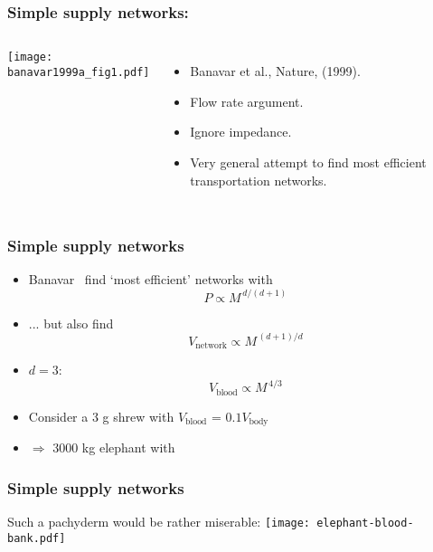 \begin{frame}
  \frametitle{Simple supply networks:}

  \begin{block}{}
  \begin{columns}
    \texttt{[image: banavar1999a\_fig1.pdf]}
    \begin{itemize}
    \item 
      Banavar et al., Nature, (1999)\cite{banavar1999a}.
    \item 
      Flow rate argument.
    \item 
      Ignore impedance.
    \item 
      Very general attempt to find most efficient transportation networks.
    \end{itemize}
  \end{columns}
    
  \end{block}


\end{frame}


\begin{frame}
  \frametitle{Simple supply networks}

  \begin{block}{}
  \begin{itemize}
  \item<1->
    Banavar \etal\ find `most efficient' networks with
    $$P \propto M^{\, d/(d+1)}$$
  \item<2->
    ... but also find 
    $$V_{\textrm{network}} \propto M^{\, (d+1)/d}$$
  \item<3->
    $d=3$:
    $$V_{\textrm{blood}} \propto M^{\, 4/3}$$
  \item<4-> Consider a 3 g shrew with $V_{\textrm{blood}}$ = $0.1V_{\textrm{body}}$
  \item<5-> $\Rightarrow$
    3000 kg elephant with 
  \end{itemize}
  \end{block}

\end{frame}

\begin{frame}
  \frametitle{Simple supply networks}

  \begin{block}{Such a pachyderm would be rather miserable:}
    \texttt{[image: elephant-blood-bank.pdf]}
  \end{block}
  
\end{frame}

